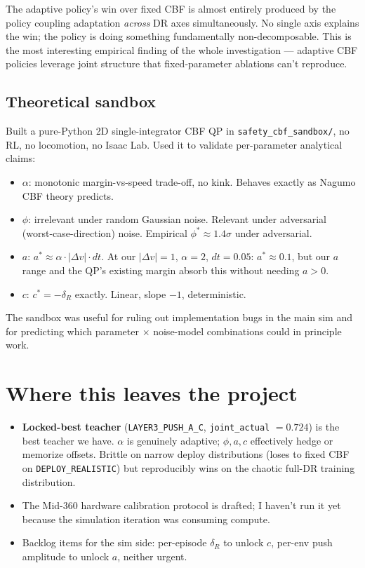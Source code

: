 \documentclass[11pt]{article}
\begin{document}
The adaptive policy's win over fixed CBF is almost entirely produced by the policy coupling adaptation \emph{across} DR axes simultaneously. No single axis explains the win; the policy is doing something fundamentally non-decomposable. This is the most interesting empirical finding of the whole investigation --- adaptive CBF policies leverage joint structure that fixed-parameter ablations can't reproduce.

\subsection*{Theoretical sandbox}

Built a pure-Python 2D single-integrator CBF QP in \texttt{safety\_cbf\_sandbox/}, no RL, no locomotion, no Isaac Lab. Used it to validate per-parameter analytical claims:

\begin{itemize}
\item $\alpha$: monotonic margin-vs-speed trade-off, no kink. Behaves exactly as Nagumo CBF theory predicts.
\item $\phi$: irrelevant under random Gaussian noise. Relevant under adversarial (worst-case-direction) noise. Empirical $\phi^* \approx 1.4\sigma$ under adversarial.
\item $a$: $a^* \approx \alpha \cdot |\Delta v| \cdot dt$. At our $|\Delta v|=1$, $\alpha=2$, $dt=0.05$: $a^* \approx 0.1$, but our $a$ range and the QP's existing margin absorb this without needing $a > 0$.
\item $c$: $c^* = -\delta_R$ exactly. Linear, slope $-1$, deterministic.
\end{itemize}

The sandbox was useful for ruling out implementation bugs in the main sim and for predicting which parameter $\times$ noise-model combinations could in principle work.

\section*{Where this leaves the project}

\begin{itemize}
\item \textbf{Locked-best teacher} (\texttt{LAYER3\_PUSH\_A\_C}, \texttt{joint\_actual} $= 0.724$) is the best teacher we have. $\alpha$ is genuinely adaptive; $\phi, a, c$ effectively hedge or memorize offsets. Brittle on narrow deploy distributions (loses to fixed CBF on \texttt{DEPLOY\_REALISTIC}) but reproducibly wins on the chaotic full-DR training distribution.
\item The Mid-360 hardware calibration protocol is drafted; I haven't run it yet because the simulation iteration was consuming compute.
\item Backlog items for the sim side: per-episode $\delta_R$ to unlock $c$, per-env push amplitude to unlock $a$, neither urgent.
\end{itemize}
\end{document}
